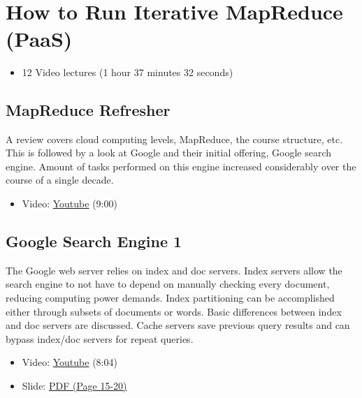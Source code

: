 \FILENAME\

\section{How to Run Iterative MapReduce
(PaaS)}\label{how-to-run-iterative-mapreduce-paas}

\begin{itemize}

\item
  12 Video lectures (1 hour 37 minutes 32 seconds)
\end{itemize}

\subsection{MapReduce Refresher}\label{mapreduce-refresher}

A review covers cloud computing levels, MapReduce, the course structure,
etc. This is followed by a look at Google and their initial offering,
Google search engine. Amount of tasks performed on this engine increased
considerably over the course of a single decade.

\begin{itemize}

\item
  Video: \href{https://www.youtube.com/watch?v=0TRTdzgC_N0}{Youtube}
  (9:00)
\end{itemize}

\subsection{Google Search Engine 1}\label{google-search-engine-1}

The Google web server relies on index and doc servers. Index servers
allow the search engine to not have to depend on manually checking every
document, reducing computing power demands. Index partitioning can be
accomplished either through subsets of documents or words. Basic
differences between index and doc servers are discussed. Cache servers
save previous query results and can bypass index/doc servers for repeat
queries.

\begin{itemize}

\item
  Video: \href{https://www.youtube.com/watch?v=S2oT7uMw5Yg}{Youtube}
  (8:04)
\end{itemize}

\begin{itemize}

\item
  Slide:
  \href{https://drive.google.com/open?id=0B88HKpainTSfYWZ0dDlrNThkVms}{PDF
  (Page 15-20)}
\end{itemize}

